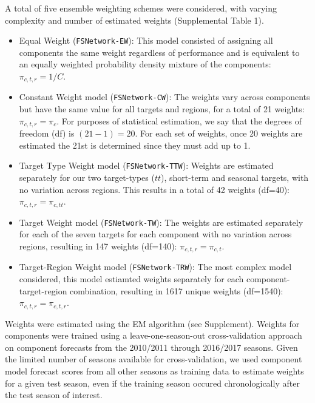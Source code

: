 \documentclass{article}\usepackage[]{graphicx}\usepackage[]{color}
\begin{document}
A total of five ensemble weighting schemes were considered, with varying complexity and number of estimated weights (Supplemental Table 1).
\begin{itemize}
\item 
Equal Weight ({\tt FSNetwork-EW}): This model consisted of assigning all components the same weight regardless of performance and is equivalent to an equally weighted probability density mixture of the components: $\pi_{c,t,r} = 1/C$. 

\item
Constant Weight model ({\tt FSNetwork-CW}): The weights vary across components but have the same value for all targets and regions, for a total of 21 weights: $\pi_{c,t,r} = \pi_c$. For purposes of statistical estimation, we say that the degrees of freedom (df) is $(21-1)=20$. For each set of weights, once 20 weights are estimated the 21st is determined since they must add up to 1.

\item
Target Type Weight model ({\tt FSNetwork-TTW}): Weights are estimated separately for our two target-types ($tt$), short-term and seasonal targets, with no variation across regions. This results in a total of 42 weights (df=40): $\pi_{c,t,r} = \pi_{c,tt}$. 

\item
Target Weight model ({\tt FSNetwork-TW}): The weights are estimated separately for each of the seven targets for each component with no variation across regions, resulting in 147 weights (df=140): $\pi_{c,t,r} = \pi_{c,t}$.

\item
Target-Region Weight model ({\tt FSNetwork-TRW}): The most complex model considered, this model estiamted weights separately for each component-target-region combination, resulting in 1617 unique weights (df=1540): $\pi_{c,t,r} = \pi_{c,t,r}$.

\end{itemize}

Weights were estimated using the EM algorithm (see Supplement). Weights for components were trained using a leave-one-season-out cross-validation approach on component forecasts from the 2010/2011 through 2016/2017 seasons. Given the limited number of seasons available for cross-validation, we used component model forecast scores from all other seasons as training data to estimate weights for a given test season, even if the training season occured chronologically after the test season of interest. 
\end{document}
